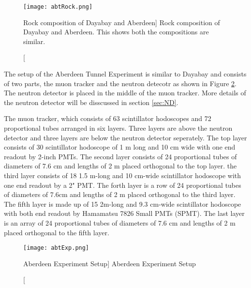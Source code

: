 \begin{figure}
    \label{fig:abtRock.png}
    \centering
    \texttt{[image: abtRock.png]}
    \caption
    [Rock composition of Dayabay and Aberdeen]
    {Rock composition of Dayabay and Aberdeen. This shows both the compositions are similar.}
    \end{figure}


The setup of the Aberdeen Tunnel Experiment is similar to Dayabay and consists of
two parts, the muon tracker and the neutron detecotr as shown in Figure \ref{fig:abtExp.png}. The neutron detector is placed in the
middle of the muon tracker.
More details of the neutron detector will be disscussed in section \ref{sec:ND}.

The muon tracker, which consists of 63 scintillator hodoscopes and 72 proportional
tubes arranged in six layers.
Three layers are above the neutron detector and three layers are below the neutron detector seperately.
The top layer consists of 30 scintillator hodoscope of 1 m long and 10 cm wide with
one end readout by 2-inch PMTs. The second layer consists of 24 proportional tubes of diameters of
7.6 cm and lengths of 2 m placed orthogonal to the top layer. the third layer consists of 18 1.5 m-long
and 10 cm-wide scintillator hodoscope with one end readout by a 2" PMT. The forth layer is a row
of 24 proportional tubes of diameters of 7.6cm and lengths of 2 m placed orthogonal to the third layer.
The fifth layer is made up of 15 2m-long and 9.3 cm-wide scintillator hodoscope with both end
readout by Hamamatsu 7826 Small PMTs (SPMT). The last layer is an array of 24 proportional tubes
of diameters of 7.6 cm and lengths of 2 m placed  orthogonal to the fifth layer.




\begin{figure}
    \label{fig:abtExp.png}
    \centering
    \texttt{[image: abtExp.png]}
    \caption
    [Aberdeen Experiment Setup]
    {Aberdeen Experiment Setup}
    \end{figure}







